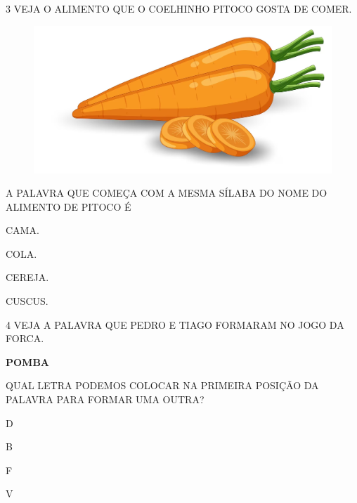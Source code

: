 \num{3} VEJA O ALIMENTO QUE O COELHINHO PITOCO GOSTA DE COMER.

\begin{figure}[H]
\centering
\includegraphics[width=\textwidth]{./media/image223.png}
\end{figure}

A PALAVRA QUE COMEÇA COM A MESMA SÍLABA DO NOME DO ALIMENTO DE PITOCO É

\begin{escolha}
\item CAMA.

\item COLA.

\item CEREJA.

\item CUSCUS.

\end{escolha}

\num{4} VEJA A PALAVRA QUE PEDRO E TIAGO FORMARAM NO JOGO DA FORCA.

\begin{myquote}
\begin{center}
\textbf{POMBA}
\end{center}
\end{myquote}

QUAL LETRA PODEMOS COLOCAR NA PRIMEIRA POSIÇÃO DA PALAVRA PARA FORMAR UMA OUTRA?

\begin{escolha}
\item D

\item B

\item F

\item V

\end{escolha}

